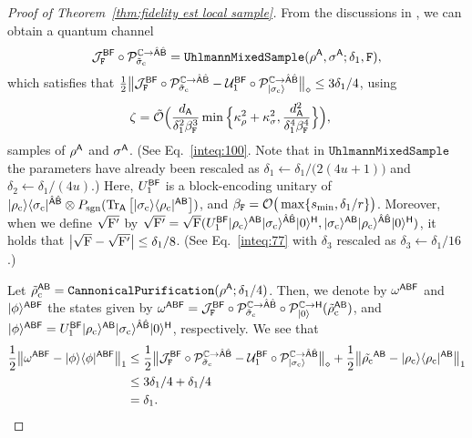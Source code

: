 \begin{proof}[Proof of Theorem~\ref{thm:fidelity est local sample}]
    



From the discussions in , we can obtain a quantum channel
\begin{align}
    {\mathcal{J}}_{\mathtt{F}}^{{\mathsf{B}}{\mathsf{F}}}\circ{\mathcal{P}}_{\tilde{\sigma}_{\rm c}}^{\mathbb{C}\rightarrow\hat{{\mathsf{A}}}\hat{{\mathsf{B}}}} = \mathtt{UhlmannMixedSample}(\rho^{\mathsf{A}}, \sigma^{\mathsf{A}}; \delta_1, \mathtt{F}),
\end{align}
which satisfies that $\frac{1}{2}\big\|{\mathcal{J}}_{\mathtt{F}}^{{\mathsf{B}}{\mathsf{F}}}\circ{\mathcal{P}}_{\tilde{\sigma}_{\rm c}}^{\mathbb{C}\rightarrow\hat{{\mathsf{A}}}\hat{{\mathsf{B}}}} - {\mathcal{U}}_1^{{\mathsf{B}}{\mathsf{F}}}\circ{\mathcal{P}}_{|\sigma_{\rm c}\rangle}^{\mathbb{C}\rightarrow\hat{{\mathsf{A}}}\hat{{\mathsf{B}}}}\big\|_\diamond \leq 3\delta_1/4$, using 
\begin{align}
\label{inteq:75}
    \zeta &= \tilde{{\mathcal{O}}}\Big(\frac{d_{\mathsf{A}}}{\delta_1^2\beta_{\mathtt{F}}^3}\min\Big\{\kappa_\rho^2 + \kappa_\sigma^2, \frac{d_{\mathsf{A}}^2}{\delta_1^4\beta_{\mathtt{F}}^4}\Big\}\Big),
\end{align}
samples of $\rho^{\mathsf{A}}$ and $\sigma^{\mathsf{A}}$. (See Eq.~\eqref{inteq:100}. Note that in $\mathtt{UhlmannMixedSample}$ the parameters have already been rescaled as $\delta_1 \gets \delta_1/\big(2(4u+1)\big)$ and $\delta_2 \gets \delta_1/(4u)$.)
Here, $U_1^{{\mathsf{B}}{\mathsf{F}}}$ is a block-encoding unitary of $|\rho_{\rm c}\rangle\langle\sigma_{\rm c}|^{\hat{{\mathsf{A}}}\hat{{\mathsf{B}}}} \otimes P_{\mathrm{sgn}}(\operatorname{Tr}_{{\mathsf{A}}}\big[|\sigma_{\rm c}\rangle\langle\rho_{\rm c}|^{{\mathsf{A}}{\mathsf{B}}}\big])$, and $\beta_{\mathtt{F}} = {\mathcal{O}}\big(\max\{s_{\rm min}, \delta_1/r\}\big)$. Moreover, when we define $\sqrt{{\mathrm{F}}'}$ by $\sqrt{{\mathrm{F}}'} = \sqrt{{\mathrm{F}}}(U_1^{{\mathsf{B}}{\mathsf{F}}}|\rho_{\rm c}\rangle^{{\mathsf{A}}{\mathsf{B}}}|\sigma_{\rm c}\rangle^{\hat{{\mathsf{A}}}\hat{{\mathsf{B}}}}|0\rangle^{{\mathsf{H}}}, |\sigma_{\rm c}\rangle^{{\mathsf{A}}{\mathsf{B}}}|\rho_{\rm c}\rangle^{\hat{{\mathsf{A}}}\hat{{\mathsf{B}}}}|0\rangle^{{\mathsf{H}}})$, it holds that $\big|\sqrt{{\mathrm{F}}} - \sqrt{{\mathrm{F}}'}\big| \leq \delta_1/8$. (See Eq.~\eqref{inteq:77} with $\delta_3$ rescaled as $\delta_3 \gets \delta_1/16$.)


Let $\tilde{\rho}_{\rm c}^{{\mathsf{A}}{\mathsf{B}}} = \mathtt{CannonicalPurification}(\rho^{\mathsf{A}}; \delta_1/4)$.
Then, we denote by $\omega^{{\mathsf{A}}{\mathsf{B}}{\mathsf{F}}}$ and $|\phi\rangle^{{\mathsf{A}}{\mathsf{B}}{\mathsf{F}}}$ the states given by $\omega^{{\mathsf{A}}{\mathsf{B}}{\mathsf{F}}} = {\mathcal{J}}_{\mathtt{F}}^{{\mathsf{B}}{\mathsf{F}}}\circ{\mathcal{P}}_{\tilde{\sigma}_{\rm c}}^{\mathbb{C}\rightarrow\hat{{\mathsf{A}}}\hat{{\mathsf{B}}}}\circ{\mathcal{P}}_{|0\rangle}^{\mathbb{C}\rightarrow{\mathsf{H}}}(\tilde{\rho}_{\rm c}^{{\mathsf{A}}{\mathsf{B}}})$,
and $|\phi\rangle^{{\mathsf{A}}{\mathsf{B}}{\mathsf{F}}} = U_1^{{\mathsf{B}}{\mathsf{F}}}|\rho_{\rm c}\rangle^{{\mathsf{A}}{\mathsf{B}}}|\sigma_{\rm c}\rangle^{\hat{{\mathsf{A}}}\hat{{\mathsf{B}}}}|0\rangle^{{\mathsf{H}}}$, respectively.
We see that
\begin{align}
    \frac{1}{2}\big\|\omega^{{\mathsf{A}}{\mathsf{B}}{\mathsf{F}}} - |\phi\rangle\langle\phi|^{{\mathsf{A}}{\mathsf{B}}{\mathsf{F}}}\big\|_1
    &\leq \frac{1}{2}\big\|{\mathcal{J}}_{\mathtt{F}}^{{\mathsf{B}}{\mathsf{F}}}\circ{\mathcal{P}}_{\tilde{\sigma}_{\rm c}}^{\mathbb{C}\rightarrow\hat{{\mathsf{A}}}\hat{{\mathsf{B}}}} - {\mathcal{U}}_1^{{\mathsf{B}}{\mathsf{F}}}\circ{\mathcal{P}}_{|\sigma_{\rm c}\rangle}^{\mathbb{C}\rightarrow\hat{{\mathsf{A}}}\hat{{\mathsf{B}}}}\big\|_\diamond + \frac{1}{2}\big\|\tilde{\rho_{\rm c}}^{{\mathsf{A}}{\mathsf{B}}} - |\rho_{\rm c}\rangle\langle\rho_{\rm c}|^{{\mathsf{A}}{\mathsf{B}}}\big\|_1 \\
    &\leq 3\delta_1/4 + \delta_1/4 \\
    \label{inteq:73}
    &=\delta_1.
\end{align}



\end{proof}
